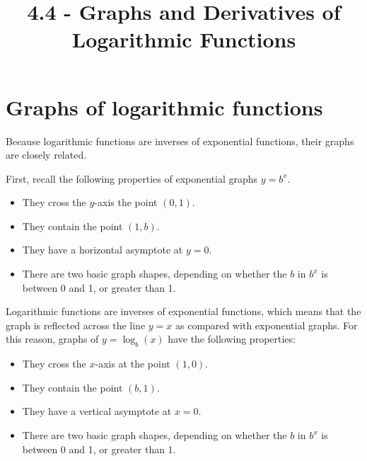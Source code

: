 \documentclass{ximera}
\title{4.4 - Graphs and Derivatives of Logarithmic Functions}
\begin{document}
\begin{abstract}
\end{abstract}
\maketitle

\section{Graphs of logarithmic functions}

Because logarithmic functions are inverses of exponential functions, their graphs are closely related. 

First, recall the following properties of exponential graphs $y=b^x$.

\begin{itemize}
\item They cross the $y$-axis the point $(0,1)$.
\item They contain the point $(1,b)$.
\item They have a horizontal asymptote at $y=0$.
\item There are two basic graph shapes, depending on whether the $b$ in $b^x$ is between 0 and 1, or greater than 1.
\end{itemize}

Logarithmic functions are inverses of exponential functions, which means that the graph is reflected across the line $y=x$ as compared with exponential graphs. For this reason, graphs of $y=\log_b(x)$ have the following properties:

\begin{itemize}
\item They cross the $x$-axis at the point $(1,0)$.
\item They contain the point $(b,1)$.
\item They have a vertical asymptote at $x=0$.
\item There are two basic graph shapes, depending on whether the $b$ in $b^x$ is between 0 and 1, or greater than 1.
\end{itemize}
\end{document}
